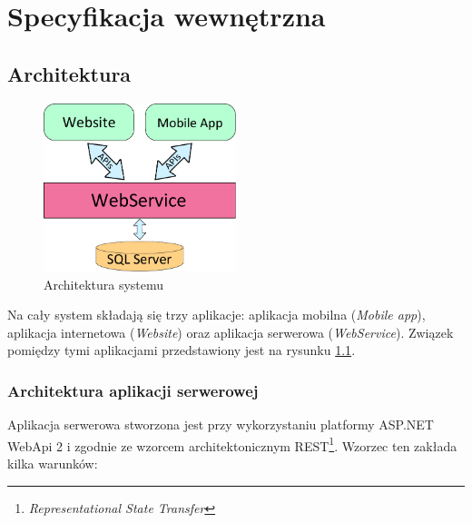 \documentclass[a4paper]{book}
\begin{document}


	\chapter{Specyfikacja wewnętrzna}
	\label{id:cha:specyfikacja_wewnetrzna}
	
		\section{Architektura}
		\label{id:sec:architektura}
		\begin{figure}		
			\centering
			\includegraphics[width=0.5\textwidth]{images/architektura.pdf}
			\caption{Architektura systemu}
			\label{fig:architektura}
		\end{figure}
		
		Na cały system składają się trzy aplikacje: aplikacja mobilna (\emph{Mobile app}), aplikacja internetowa (\emph{Website}) oraz aplikacja serwerowa (\emph{WebService}). Związek pomiędzy tymi aplikacjami przedstawiony jest na rysunku \ref{fig:architektura}. 
			
			\subsection{Architektura aplikacji serwerowej}
			
			
			
			Aplikacja serwerowa stworzona jest przy wykorzystaniu platformy ASP.NET WebApi 2 i zgodnie ze wzorcem architektonicznym REST\footnote{\emph{Representational State Transfer}}. Wzorzec ten zakłada kilka warunków:
			
\end{document}
